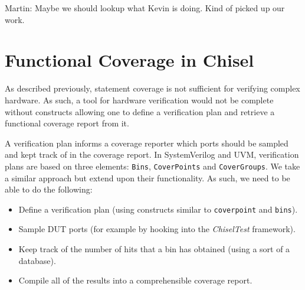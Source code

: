 \documentclass[conference]{IEEEtran}
\newcommand{\martin}[1]{{\color{blue} Martin: #1}}
\begin{document}

\martin{Maybe we should lookup what Kevin is doing. Kind of picked up our work.}

\section{Functional Coverage in Chisel}

As described previously, statement coverage is not sufficient for verifying complex hardware. As such, a tool for hardware verification would not be complete without constructs allowing one to define a verification plan and retrieve a functional coverage report from it. %

A verification plan informs a coverage reporter which ports should be sampled and kept track of in the coverage report. In SystemVerilog and UVM, verification plans are based on three elements: \texttt{Bins}, \texttt{CoverPoints} and \texttt{CoverGroups}. We take a similar approach but extend upon their functionality. As such, we need to be able to do the following: %
\begin{itemize}
    \item Define a verification plan (using constructs similar to \texttt{coverpoint} and \texttt{bins}).
    \item Sample DUT ports (for example by hooking into the \textit{ChiselTest} framework).
    \item Keep track of the number of hits that a bin has obtained (using a sort of a database).
    \item Compile all of the results into a comprehensible coverage report.
\end{itemize}
\end{document}
